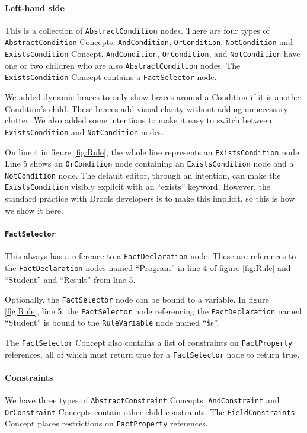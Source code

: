 \paragraph{Left-hand side} This is a collection of \texttt{AbstractCondition} nodes.
There are four types of \texttt{AbstractCondition} Concepts.
\texttt{AndCondition}, \texttt{OrCondition}, \texttt{NotCondition} and \texttt{ExistsCondition} Concept.
\texttt{AndCondition}, \texttt{OrCondition}, and \texttt{NotCondition} have one or two children who are also \texttt{AbstractCondition} nodes.
The \texttt{ExistsCondition} Concept contains a \texttt{FactSelector} node.

We added dynamic braces to only show braces around a Condition if it is another Condition's child. 
These braces add visual clarity without adding unnecessary clutter.
We also added some intentions to make it easy to switch between \texttt{ExistsCondition} and \texttt{NotCondition} nodes.

On line 4 in figure \ref{fig:Rule}, the whole line represents an \texttt{ExistsCondition} node.
Line 5 shows an \texttt{OrCondition} node containing an \texttt{ExistsCondition} node and a \texttt{NotCondition} node.
The default editor, through an intention, can make the \texttt{ExistsCondition} visibly explicit with an ``exists'' keyword.
However, the standard practice with Drools developers is to make this implicit, so this is how we show it here.

\paragraph{\texttt{FactSelector}} This always has a reference to a \texttt{FactDeclaration} node.
These are references to the \texttt{FactDeclaration} nodes named ``Program'' in line 4 of figure \ref{fig:Rule} and ``Student'' and ``Result'' from line 5.

Optionally, the \texttt{FactSelector} node can be bound to a variable.
In figure \ref{fig:Rule}, line 5, the \texttt{FactSelector} node referencing the \texttt{FactDeclaration} named ``Student'' is bound to the \texttt{RuleVariable} node named ``\$s''.

The \texttt{FactSelector} Concept also contains a list of constraints on \texttt{FactProperty} references, all of which must return true for a \texttt{FactSelector} node to return true.

\paragraph{Constraints} We have three types of \texttt{AbstractConstraint} Concepts.
\texttt{AndConstraint} and \texttt{OrConstraint} Concepts contain other child constraints.
The \texttt{FieldConstraints} Concept places restrictions on \texttt{FactProperty} references.

